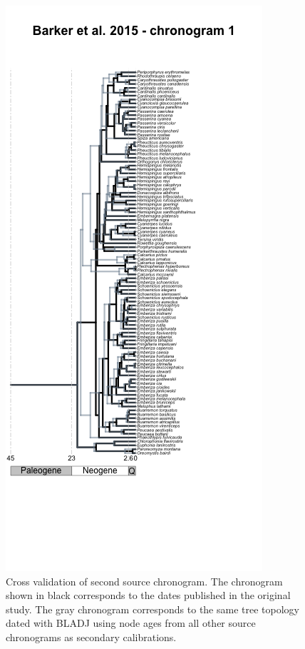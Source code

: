 \documentclass[
  english,
  man]{apa6}
\begin{document}
\begin{figure}[!h]
\includegraphics{../figures/figure-cross-validation/cross_validation_2.png}
\caption{Cross validation of second source chronogram. The chronogram shown in black corresponds to the dates published in the original study. The gray chronogram corresponds to the same tree topology dated with BLADJ using node ages from all other source chronograms as secondary calibrations.}
\label{fig:cv2}
\end{figure}
\end{document}
